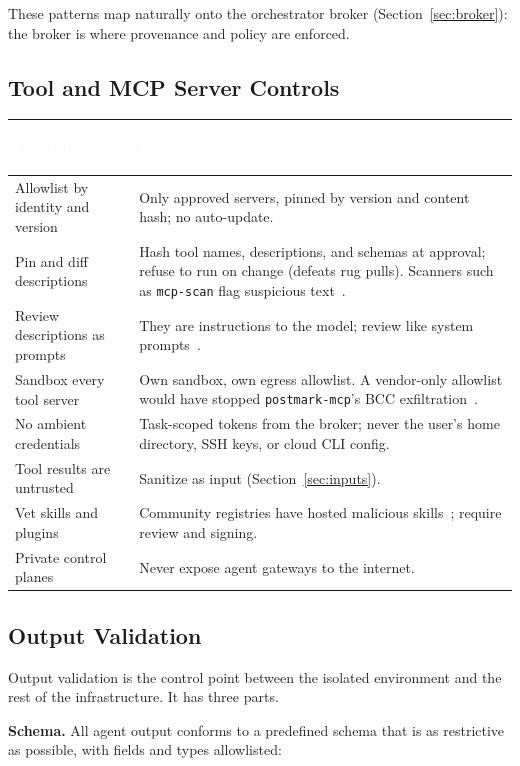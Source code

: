 \documentclass[11pt,letterpaper]{article}
\newcommand{\hrow}{\rowcolor{slategraphite}}
\newcommand{\hdr}[1]{\textcolor{white}{\bfseries\strut #1}}
\begin{document}
These patterns map naturally onto the orchestrator broker (Section~\ref{sec:broker}): the broker is where provenance and policy are enforced.

\subsection{Tool and MCP Server Controls}
\label{sec:mcp}

\begin{longtable}{L{4.2cm} L{11.8cm}}
\hrow \hdr{Control} & \hdr{Purpose} \\
\endhead
Allowlist by identity and version & Only approved servers, pinned by version and content hash; no auto-update. \\
Pin and diff descriptions & Hash tool names, descriptions, and schemas at approval; refuse to run on change (defeats rug pulls). Scanners such as \texttt{mcp-scan} flag suspicious text~\cite{invariant}. \\
Review descriptions as prompts & They are instructions to the model; review like system prompts~\cite{owaspmcp}. \\
Sandbox every tool server & Own sandbox, own egress allowlist. A vendor-only allowlist would have stopped \texttt{postmark-mcp}'s BCC exfiltration~\cite{postmark}. \\
No ambient credentials & Task-scoped tokens from the broker; never the user's home directory, SSH keys, or cloud CLI config. \\
Tool results are untrusted & Sanitize as input (Section~\ref{sec:inputs}). \\
Vet skills and plugins & Community registries have hosted malicious skills~\cite{openclaw}; require review and signing. \\
Private control planes & Never expose agent gateways to the internet. \\*
\bottomrule
\end{longtable}

\subsection{Output Validation}

\label{sec:outputs}


Output validation is the control point between the isolated environment and the rest of the infrastructure. It has three parts.

\textbf{Schema.} All agent output conforms to a predefined schema that is as restrictive as possible, with fields and types allowlisted:
\end{document}
